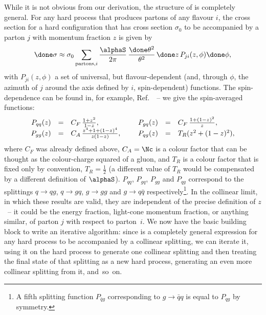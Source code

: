 While it is not obvious from our derivation, the structure of
 is completely general.  For any hard process that
produces partons of any flavour $i$, the cross section for a hard
configuration that has cross section $\sigma_0$ to be accompanied by a
parton $j$ with momentum fraction $z$ is given by
\begin{equation}
  \label{collinear}
  \done\sigma \approx \sigma_0 \sum_{\mathrm{partons},i}
  \frac{\alphaS}{2\pi} \, \frac{\done\theta^2}{\theta^2}
  \, \done z\,P_{ji}(z,\phi) \done\phi,
\end{equation}
with $P_{ji}(z,\phi)$ a set of universal, but flavour-dependent (and,
through $\phi$, the azimuth of $j$ around the axis
defined by $i$, spin-dependent) functions.  The spin-dependence can be
found in, for example, Ref.~\cite{Ellis:1991qj}~-- we give the
spin-averaged functions:
\begin{equation}
  \label{DGLAP}
  \begin{array}{rcl@{\hspace*{2.5em}}rcl}
    P_{qq}(z) &=& C_F\,\frac{1+z^2}{1-z}, &
    P_{gq}(z) &=& C_F\,\frac{1+(1-z)^2}z, \\
    P_{gg}(z) &=& C_A\,\frac{z^4+1+(1-z)^4}{z(1-z)}, &
    P_{qg}(z) &=& T_R(z^2+(1-z)^2),
  \end{array}
\end{equation}
where $C_F$ was already defined above, $C_A=\Nc$ is a colour factor that
can be thought as the colour-charge squared of a gluon, and $T_R$
is a colour factor that is fixed only by convention, $T_R=\frac12$ (a
different value of $T_R$ would be compensated by a different definition
of $\alphaS$).  $P_{qq}$, $P_{gq}$, $P_{gg}$ and $P_{qg}$ correspond to the
splittings $q\to qg$, $q\to gq$, $g\to gg$ and $g\to q\bar{q}$
respectively\footnote{A fifth splitting function $P_{\bar{q}g}$
  corresponding to $g\to\bar{q}q$  is equal to $P_{qg}$ by symmetry.}.
In the collinear limit, in which these results are valid, they are
independent of the precise definition of $z$~-- it could be the energy
fraction, light-cone momentum fraction, or anything similar, of parton
$j$ with respect to parton~$i$.
We now have the basic building block to write an iterative algorithm:
since  is a completely general expression for any hard
process to be accompanied by a collinear splitting, we can iterate it,
using it on the hard process to generate one collinear splitting and
then treating the final state of that splitting as a new hard process,
generating an even more collinear splitting from it, and~so~on.


